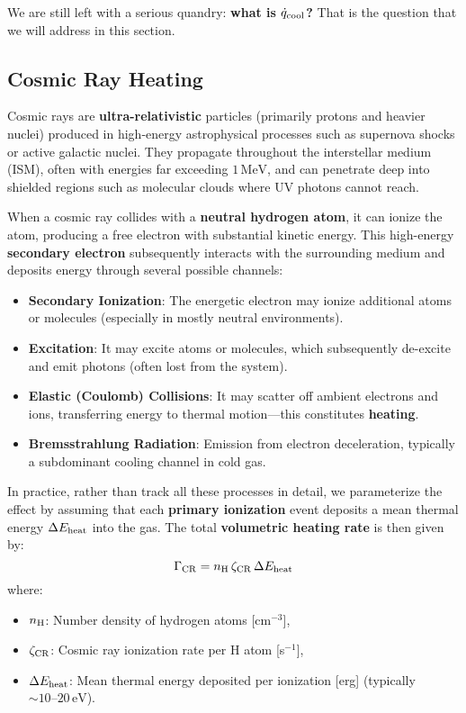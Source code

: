 We are still left with a serious quandry: \textbf{what is $\dot{q}_{\rm cool}$?} That is the question that we will address in this section.

\subsection{Cosmic Ray Heating}

Cosmic rays are \textbf{ultra-relativistic} particles (primarily protons and heavier nuclei) produced in high-energy astrophysical processes such as supernova shocks or active galactic nuclei. They propagate throughout the interstellar medium (ISM), often with energies far exceeding \( 1\, \mathrm{MeV} \), and can penetrate deep into shielded regions such as molecular clouds where UV photons cannot reach.

When a cosmic ray collides with a \textbf{neutral hydrogen atom}, it can ionize the atom, producing a free electron with substantial kinetic energy. This high-energy \textbf{secondary electron} subsequently interacts with the surrounding medium and deposits energy through several possible channels:

\begin{itemize}
    \item \textbf{Secondary Ionization}: The energetic electron may ionize additional atoms or molecules (especially in mostly neutral environments).
    \item \textbf{Excitation}: It may excite atoms or molecules, which subsequently de-excite and emit photons (often lost from the system).
    \item \textbf{Elastic (Coulomb) Collisions}: It may scatter off ambient electrons and ions, transferring energy to thermal motion—this constitutes \textbf{heating}.
    \item \textbf{Bremsstrahlung Radiation}: Emission from electron deceleration, typically a subdominant cooling channel in cold gas.
\end{itemize}

In practice, rather than track all these processes in detail, we parameterize the effect by assuming that each \textbf{primary ionization} event deposits a mean thermal energy \( \Delta E_{\rm heat} \) into the gas. The total \textbf{volumetric heating rate} is then given by:
\[
\Gamma_{\rm CR} = n_{\rm H} \, \zeta_{\rm CR} \, \Delta E_{\rm heat}
\]
where:
\begin{itemize}
    \item \( n_{\rm H} \): Number density of hydrogen atoms [cm\(^{-3}\)],
    \item \( \zeta_{\rm CR} \): Cosmic ray ionization rate per H atom [s\(^{-1}\)],
    \item \( \Delta E_{\rm heat} \): Mean thermal energy deposited per ionization [erg] (typically \( \sim 10\text{–}20 \, \mathrm{eV} \)).
\end{itemize}

